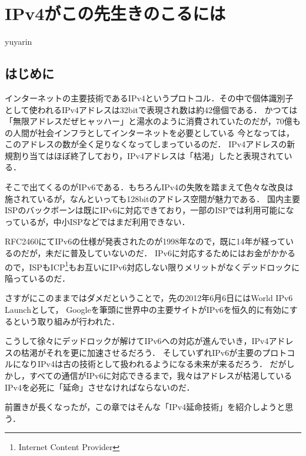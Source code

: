 

\chapter{IPv4がこの先生きのこるには}

\begin{flushright}
 yuyarin %
\end{flushright}

\section{はじめに}

\lettrine{イ}
ンターネットの主要技術であるIPv4というプロトコル．その中で個体識別子として使われるIPv4アドレスは32bitで表現され数は約42億個である．
かつては「無限アドレスだぜヒャッハー」と湯水のように消費されていたのだが，70億もの人間が社会インフラとしてインターネットを必要としている
今となっては，このアドレスの数が全く足りなくなってしまっているのだ．
IPv4アドレスの新規割り当てはほぼ終了しており，IPv4アドレスは「枯渇」したと表現されている．

そこで出てくるのがIPv6である．もちろんIPv4の失敗を踏まえて色々な改良は施されているが，なんといっても128bitのアドレス空間が魅力である．
国内主要ISPのバックボーンは既にIPv6に対応できており，一部のISPでは利用可能になっているが，中小ISPなどではまだ利用できない．

RFC2460にてIPv6の仕様が発表されたのが1998年なので，既に14年が経っているのだが，未だに普及していないのだ．
IPv6に対応するためにはお金がかかるので，ISPもICP\footnote{Internet Content Provider}もお互いにIPv6対応しない限りメリットがなくデッドロックに陥っているのだ．

さすがにこのままではダメだということで，先の2012年6月6日にはWorld IPv6 Launchとして，
Googleを筆頭に世界中の主要サイトがIPv6を恒久的に有効にするという取り組みが行われた．

こうして徐々にデッドロックが解けてIPv6への対応が進んでいき，IPv4アドレスの枯渇がそれを更に加速させるだろう．
そしていずれIPv6が主要のプロトコルになりIPv4は古の技術として扱われるようになる未来が来るだろう．
だがしかし，すべての通信がIPv6に対応できるまで，我々はアドレスが枯渇しているIPv4を必死に「延命」させなければならないのだ．

前置きが長くなったが，この章ではそんな「IPv4延命技術」を紹介しようと思う．

